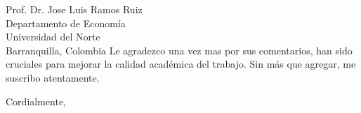 \documentclass[11pt]{letter}
\begin{document}
\begin{letter}{ Prof. Dr. Jose Luis Ramos Ruiz \\
Departamento de Economía \\
Universidad del Norte \\
Barranquilla, Colombia}
Le agradezco una vez mas por sus comentarios, han sido cruciales para mejorar la calidad académica del trabajo. Sin más que agregar, me suscribo atentamente.

\closing{Cordialmente,}
\end{letter}
\end{document}
